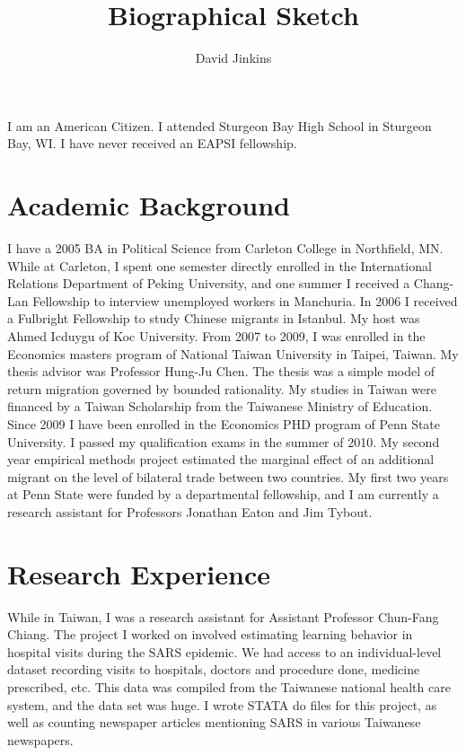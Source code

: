 \documentclass[a4paper,10pt]{article}
\title{Biographical Sketch}
\author{David Jinkins}
\begin{document}
\maketitle

I am an American Citizen.  I attended Sturgeon Bay High School in Sturgeon Bay, WI.  I have never received an EAPSI fellowship.  
\section{Academic Background}
I have a 2005 BA in Political Science from Carleton College in Northfield, MN.  While at Carleton, I spent one semester directly enrolled in the International Relations Department of Peking University, and one summer I received a Chang-Lan Fellowship to interview unemployed workers in Manchuria.  In 2006 I received a Fulbright Fellowship to study Chinese migrants in Istanbul.  My host was Ahmed Icduygu of Koc University.  From 2007 to 2009, I was enrolled in the Economics masters program of National Taiwan University in Taipei, Taiwan.  My thesis advisor was Professor Hung-Ju Chen.  The thesis was a simple model of return migration governed by bounded rationality.  My studies in Taiwan were financed by a Taiwan Scholarship from the Taiwanese Ministry of Education.  Since 2009 I have been enrolled in the Economics PHD program of Penn State University.  I passed my qualification exams in the summer of 2010.  My second year empirical methods project estimated the marginal effect of an additional migrant on the level of bilateral trade between two countries.  My first two years at Penn State were funded by a departmental fellowship, and I am currently a research assistant for Professors Jonathan Eaton and Jim Tybout.           

\section{Research Experience}
While in Taiwan, I was a research assistant for Assistant Professor Chun-Fang Chiang.  The project I worked on involved estimating learning behavior in hospital visits during the SARS epidemic.  We had access to an individual-level dataset recording visits to hospitals, doctors and procedure done, medicine prescribed, etc.  This data was compiled from the Taiwanese national health care system, and the data set was huge.  I wrote STATA do files for this project, as well as counting newspaper articles mentioning SARS in various Taiwanese newspapers.
\end{document}
